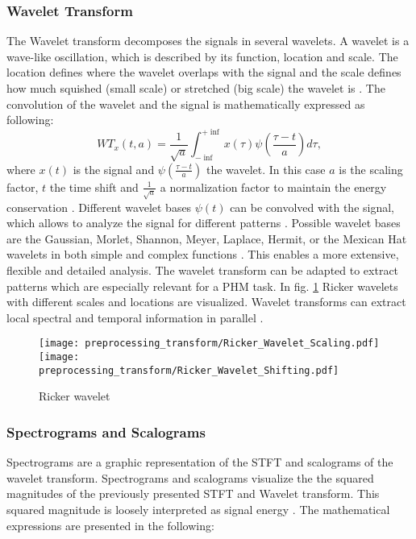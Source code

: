 \subsubsection{Wavelet Transform}
The Wavelet transform decomposes the signals in several wavelets. A wavelet is a wave-like oscillation, which is described by its function, location and scale. The location defines where the wavelet overlaps with the signal and the scale defines how much squished (small scale) or stretched (big scale) the wavelet is \cite{Shawhin2020}. The convolution of the wavelet and the signal is mathematically expressed as following:
\begin{equation}
    WT_{x}(t,a) = \frac{1}{\sqrt{a}} \int_{- \inf}^{+ \inf} x(\tau) \psi(\frac{\tau -t}{a}) d \tau,
\end{equation}
 where $x(t)$ is the signal and $\psi(\frac{\tau -t}{a})$ the wavelet. In this case $a$ is the scaling factor, $t$ the time shift and $\frac{1}{\sqrt{a}}$ a normalization factor to maintain the energy conservation \cite{FENG2013}. Different wavelet bases $\psi(t)$ can be convolved with the signal, which allows to analyze the signal for different patterns \cite{Shawhin2020}. Possible wavelet bases are the Gaussian, Morlet, Shannon, Meyer, Laplace, Hermit, or the Mexican Hat wavelets in both simple and complex functions \cite{Verstraete2017}. This enables a more extensive, flexible and detailed analysis. The wavelet transform can be adapted to extract patterns which are especially relevant for a PHM task. In fig. \ref{fig:ricker_wavelet} Ricker wavelets with different scales and locations are visualized. Wavelet transforms can extract local spectral and temporal information in parallel \cite{Shawhin2020}.


\begin{figure}[H]
  \centering
  \texttt{[image: preprocessing\_transform/Ricker\_Wavelet\_Scaling.pdf]}
  \hspace{.1cm}
  \texttt{[image: preprocessing\_transform/Ricker\_Wavelet\_Shifting.pdf]}
  

  \caption{Ricker wavelet}
  \label{fig:ricker_wavelet}
\end{figure}

\subsubsection{Spectrograms and Scalograms}

 Spectrograms are a graphic representation of the STFT and scalograms of the wavelet transform. Spectrograms and scalograms visualize the the squared magnitudes of the previously presented STFT and Wavelet transform. This squared magnitude is loosely interpreted as signal energy \cite{Hlawatsch1992}. The mathematical expressions are presented in the following: 

